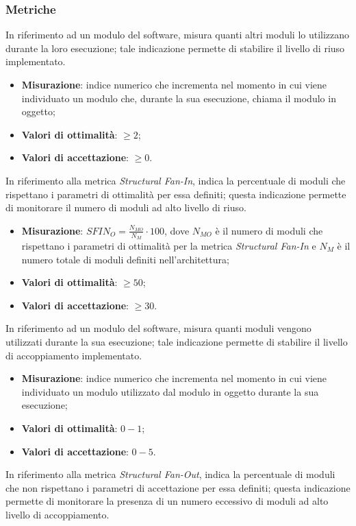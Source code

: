 \subsubsection{Metriche}
In riferimento ad un modulo del software, misura quanti altri moduli lo utilizzano durante la loro esecuzione; tale indicazione permette di stabilire il livello di riuso implementato.
\begin{itemize}
\item \textbf{Misurazione}: indice numerico che incrementa nel momento in cui viene individuato un modulo che, durante la sua esecuzione, chiama il modulo in oggetto;
\item \textbf{Valori di ottimalità}: $\geq 2$;
\item \textbf{Valori di accettazione}: $\geq 0$.
\end{itemize}
\label{sfin-ottimalita}
In riferimento alla metrica \textit{Structural Fan-In}, indica la percentuale di moduli che rispettano i parametri di ottimalità per essa definiti; questa indicazione permette di monitorare il numero di moduli ad alto livello di riuso.
\begin{itemize}
\item \textbf{Misurazione}: $SFIN_{O}=\frac{N_{MO}}{N_{M}} \cdot 100$, dove $N_{MO}$ è il numero di moduli che rispettano i parametri di ottimalità per la metrica \textit{Structural Fan-In} e $N_{M}$ è il numero totale di moduli definiti nell'architettura;
\item \textbf{Valori di ottimalità}: $\geq 50$;
\item \textbf{Valori di accettazione}: $\geq 30$.
\end{itemize}
\label{SFOUT}
In riferimento ad un modulo del software, misura quanti moduli vengono utilizzati durante la sua esecuzione; tale indicazione permette di stabilire il livello di accoppiamento implementato.
\begin{itemize}
\item \textbf{Misurazione}: indice numerico che incrementa nel momento in cui viene individuato un modulo utilizzato dal modulo in oggetto durante la sua esecuzione;
\item \textbf{Valori di ottimalità}: $0 - 1$;
\item \textbf{Valori di accettazione}: $0 - 5$.
\end{itemize}
\label{sfout-NonAcc}
In riferimento alla metrica \textit{Structural Fan-Out}, indica la percentuale di moduli che non rispettano i parametri di accettazione per essa definiti; questa indicazione permette di monitorare la presenza di un numero eccessivo di moduli ad alto livello di accoppiamento.
